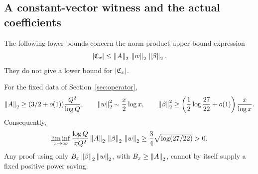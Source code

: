 \subsection{A constant-vector witness and the actual coefficients}
The following lower bounds concern the norm-product upper-bound expression
\[
|\mathfrak C_x|\le\left\|A\right\|_2\,\left\|w\right\|_2\,\left\|\beta\right\|_2.
\]
They do not give a lower bound for $|\mathfrak C_x|$.
\begin{theorem}\label{thm:normbarrier}
For the fixed data of Section~\ref{sec:operator},
\[
\left\|A\right\|_2\ge(3/2+o(1))\frac{Q^2}{\log Q},\qquad
\left\|w\right\|_2^2\sim\frac x2\log x,\qquad
\left\|\beta\right\|_2^2\ge\left(\frac12\log\frac{27}{22}+o(1)\right)\frac x{\log x}.
\]
Consequently,
\[
\liminf_{x\to\infty}\frac{\log Q}{xQ^2}\left\|A\right\|_2\,\left\|\beta\right\|_2\,\left\|w\right\|_2
\ge\frac34\sqrt{\log(27/22)}>0.
\]
Any proof using only $B_x\left\|\beta\right\|_2\left\|w\right\|_2$, with $B_x\ge\left\|A\right\|_2$, cannot by itself supply a fixed positive power saving.
\end{theorem}
